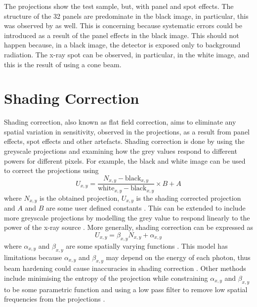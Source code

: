 The projections show the test sample, but, with panel and spot effects. The structure of the 32 panels are predominate in the black image, in particular, this was observed by \cite{yang2009evaluation} as well. This is concerning because systematic errors could be introduced as a result of the panel effects in the black image. This should not happen because, in a black image, the detector is exposed only to background radiation. The x-ray spot can be observed, in particular, in the white image, and this is the result of using a cone beam.

\afterpage{\clearpage}

\section{Shading Correction}

Shading correction, also known as flat field correction, aims to eliminate any spatial variation in sensitivity, observed in the projections, as a result from panel effects, spot effects and other artefacts. Shading correction is done by using the greyscale projections and examining how the grey values respond to different powers for different pixels. For example, the black and white image can be used to correct the projections using
\begin{equation}
U_{x,y} = \dfrac{N_{x,y}-\text{black}_{x,y}}{\text{white}_{x,y}-\text{black}_{x,y}}\times B+A
\label{eq:data_shadingCorrectionOld}
\end{equation}
where $N_{x,y}$ is the obtained projection, $U_{x,y}$ is the shading corrected projection and $A$ and $B$ are some user defined constants \citep{young2000shading, munzenmayer2003enhancing}. This can be extended to include more greyscale projections by modelling the grey value to respond linearly to the power of the x-ray source \citep{seibert1998flat}. More generally, shading correction can be expressed as
\begin{equation}
U_{x,y} = \beta_{x,y} N_{x,y} + \alpha_{x,y}
\end{equation}
where $\alpha_{x,y}$ and $\beta_{x,y}$ are some spatially varying functions \citep{munzenmayer2003enhancing}. This model has limitations because $\alpha_{x,y}$ and $\beta_{x,y}$ may depend on the energy of each photon, thus beam hardening could cause inaccuracies in shading correction \citep{davidson2003limitations}. Other methods include minimising the entropy of the projection while constraining $\alpha_{x,y}$ and $\beta_{x,y}$ to be some parametric function \citep{likar2000retrospective} and using a low pass filter to remove low spatial frequencies from the projections \citep{young2000shading, munzenmayer2003enhancing}.

